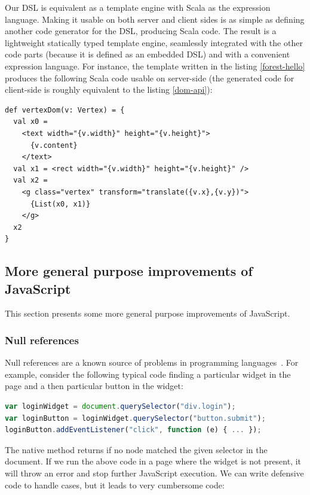 \documentclass[american,english,runningheads]{llncs}
\begin{document}
Our DSL is equivalent as a template engine with Scala as the expression language. Making it usable on both server and client sides is as simple as defining another code generator for the DSL, producing Scala code. The result is a lightweight statically typed template engine, seamlessly integrated with the other code parts (because it is defined as an embedded DSL) and with a convenient expression language. For instance, the template written in the listing \ref{forest-hello} produces the following Scala code usable on server-side (the generated code for client-side is roughly equivalent to the listing \ref{dom-api}):

\begin{lstlisting}
def vertexDom(v: Vertex) = {
  val x0 =
    <text width="{v.width}" height="{v.height}">
      {v.content}
    </text>
  val x1 = <rect width="{v.width}" height="{v.height}" />
  val x2 =
    <g class="vertex" transform="translate({v.x},{v.y})">
      {List(x0, x1)}
    </g>
  x2
}
\end{lstlisting}

\subsection{More general purpose improvements of JavaScript}

This section presents some more general purpose improvements of JavaScript.

\subsubsection{Null references}

Null references are a known source of problems in programming languages~\cite{Hoare09_Null,Nanda09_Null}. For example, consider the following typical code finding a particular widget in the page and a then particular button in the widget:

\begin{lstlisting}[language=JavaScript,label=null-unsafe,caption=Unsafe code]
var loginWidget = document.querySelector("div.login");
var loginButton = loginWidget.querySelector("button.submit");
loginButton.addEventListener("click", function (e) { ... });
\end{lstlisting}

The native  method returns  if no node matched the given selector in the document. If we run the above code in a page where the widget is not present, it will throw an error and stop further JavaScript execution. We can write defensive code to handle  cases, but it leads to very cumbersome code:
\end{document}
